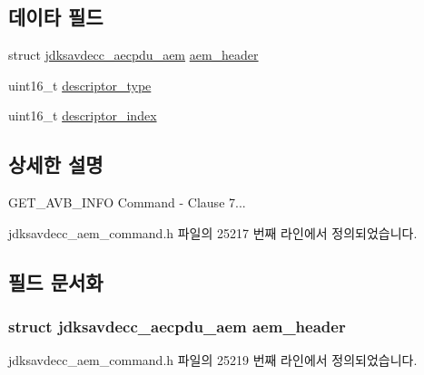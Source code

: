 \subsection*{데이타 필드}
\begin{DoxyCompactItemize}
\item 
struct \hyperlink{structjdksavdecc__aecpdu__aem}{jdksavdecc\+\_\+aecpdu\+\_\+aem} \hyperlink{structjdksavdecc__aem__command__get__avb__info_ae1e77ccb75ff5021ad923221eab38294}{aem\+\_\+header}
\item 
uint16\+\_\+t \hyperlink{structjdksavdecc__aem__command__get__avb__info_ab7c32b6c7131c13d4ea3b7ee2f09b78d}{descriptor\+\_\+type}
\item 
uint16\+\_\+t \hyperlink{structjdksavdecc__aem__command__get__avb__info_a042bbc76d835b82d27c1932431ee38d4}{descriptor\+\_\+index}
\end{DoxyCompactItemize}


\subsection{상세한 설명}
G\+E\+T\+\_\+\+A\+V\+B\+\_\+\+I\+N\+FO Command -\/ Clause 7... 

jdksavdecc\+\_\+aem\+\_\+command.\+h 파일의 25217 번째 라인에서 정의되었습니다.



\subsection{필드 문서화}
\subsubsection[{\texorpdfstring{aem\+\_\+header}{aem_header}}]{\setlength{\rightskip}{0pt plus 5cm}struct {\bf jdksavdecc\+\_\+aecpdu\+\_\+aem} aem\+\_\+header}\hypertarget{structjdksavdecc__aem__command__get__avb__info_ae1e77ccb75ff5021ad923221eab38294}{}\label{structjdksavdecc__aem__command__get__avb__info_ae1e77ccb75ff5021ad923221eab38294}


jdksavdecc\+\_\+aem\+\_\+command.\+h 파일의 25219 번째 라인에서 정의되었습니다.

